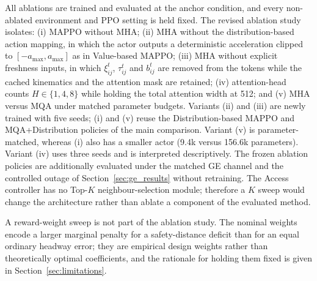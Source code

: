 \documentclass{ieeeaccess}
\begin{document}
All ablations are trained and evaluated at the anchor condition, and every non-ablated environment and PPO setting is held fixed. The revised ablation study isolates: (i) MAPPO without MHA; (ii) MHA without the distribution-based action mapping, in which the actor outputs a deterministic acceleration clipped to $[-a_{\max},a_{\max}]$ as in Value-based MAPPO; (iii) MHA without explicit freshness inputs, in which $\xi_{ij}^t$, $\tau_{ij}^t$ and $b_{ij}^t$ are removed from the tokens while the cached kinematics and the attention mask are retained; (iv) attention-head counts $H\in\{1,4,8\}$ while holding the total attention width at 512; and (v) MHA versus MQA under matched parameter budgets. Variants (ii) and (iii) are newly trained with five seeds; (i) and (v) reuse the Distribution-based MAPPO and MQA+Distribution policies of the main comparison. Variant (v) is parameter-matched, whereas (i) also has a smaller actor (9.4k versus 156.6k parameters). Variant (iv) uses three seeds and is interpreted descriptively. The frozen ablation policies are additionally evaluated under the matched GE channel and the controlled outage of Section~\ref{sec:ge_results} without retraining. The Access controller has no Top-$K$ neighbour-selection module; therefore a $K$ sweep would change the architecture rather than ablate a component of the evaluated method. %

A reward-weight sweep is not part of the ablation study. The nominal weights encode a larger marginal penalty for a safety-distance deficit than for an equal ordinary headway error; they are empirical design weights rather than theoretically optimal coefficients, and the rationale for holding them fixed is given in Section~\ref{sec:limitations}.
\end{document}
